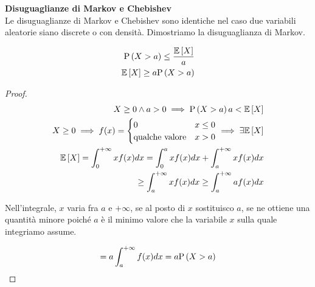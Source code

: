 \begin{defn}
    \textbf{Disuguaglianze di Markov e Chebishev} \\
    Le disuguaglianze di Markov e Chebishev sono identiche nel caso due
    variabili aleatorie siano discrete o con densità. Dimostriamo la
    disuguaglianza di Markov.

    \begin{prop}
        \begin{equation*}
            \begin{aligned}
                \text{P}\left(X > a\right) \le \dfrac{\mathbb{E}\left[X\right]}{a} \\
                \mathbb{E}\left[X\right] \geq a \text{P}\left(X > a\right)
            \end{aligned}
        \end{equation*}
    \end{prop}

    \begin{proof}
        \begin{equation*}
            \begin{aligned}
                X \geq 0 \land a > 0 \implies \text{P}\left(X > a\right) a < \mathbb{E}\left[X\right] \\
                X \geq 0 \implies f(x) = \begin{cases}
                    0 & x \leq 0 \\
                    \text{qualche valore} & x > 0
                \end{cases} \implies \exists \mathbb{E}\left[X\right] \\
                \mathbb{E}\left[X\right] = \int_{0}^{+\infty} x f(x) dx = \int_{0}^{a} x f(x) dx + \int_{a}^{+\infty} x f(x) dx \\
                \geq \int_{a}^{+\infty} x f(x) dx \geq \int_{a}^{+\infty} a f(x) dx
            \end{aligned}
        \end{equation*}

        Nell'integrale, $x$ varia fra $a$ e $+\infty$, se al posto di $x$
        sostituisco $a$, se ne ottiene una quantità minore poiché $a$ è il
        minimo valore che la variabile $x$ sulla quale integriamo assume.

        \begin{equation*}
            \begin{aligned}
                = a \int_{a}^{+\infty} f(x) dx = a \text{P}\left(X > a\right)
            \end{aligned}
        \end{equation*}

    \end{proof}
\end{defn}



